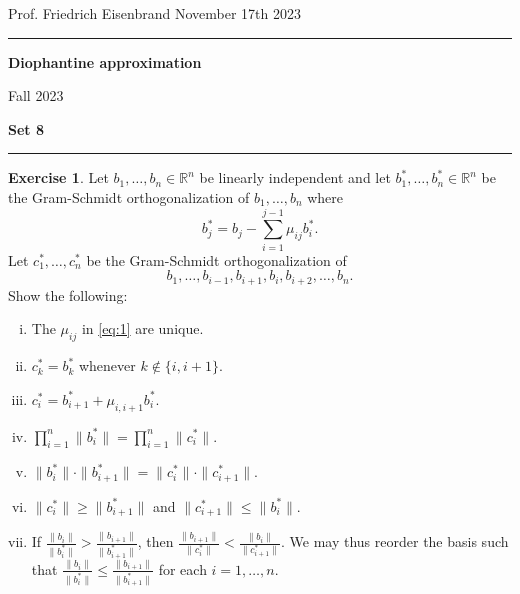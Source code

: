 \documentclass[12pt,a4paper]{article}
\date{}
\theoremstyle{plain}
\newtheorem*{Sol*}{Solution}
\theoremstyle{definition}
\newtheorem{Ex}{Exercise}
\newif\ifsolutions
\newcommand{\exercise}[2]{
			\begin{Ex} #1 \end{Ex}
			\ifsolutions  \begin{Sol*} #2 \end{Sol*} \bigskip \else \bigskip  \fi
		}
\begin{document}
\begin{center}
{Prof. Friedrich Eisenbrand \hfill November 17th 2023}
\end{center}
	
\hrule\vspace{\baselineskip}

\begin{center}
\textbf{Diophantine approximation}

Fall 2023

\bigskip

\textbf{Set 8}
\ifsolutions{\textbf{- Solutions}} \else{} \fi
\end{center}

\hrule\vspace{\baselineskip}




\exercise{Let $b_1,\dots,b_n ∈ℝ^n$ be linearly independent  and let $b_1^*,\dots,b_n^* ∈ ℝ^n$ be the Gram-Schmidt orthogonalization of $b_1,\dots,b_n$ where
  \begin{equation}
    \label{eq:1}
    b_j^* = b_j - ∑_{i=1}^{j-1}μ_{ij} b_i^*. 
  \end{equation}
  Let $c_1^*,\dots,c_n^*$ be the Gram-Schmidt orthogonalization of
  \begin{displaymath}
    b_1,\dots,b_{i-1},b_{i+1},b_i,b_{i+2},\dots,b_n.
  \end{displaymath}
  Show the following:
  \begin{enumerate}[i)]
  \item The $μ_{ij}$ in \eqref{eq:1} are unique.
  \item $c_k^* = b_k^*$ whenever $k ∉\{i,i+1\}$.
  \item $c_i^* = b_{i+1}^* + μ_{i,i+1} b_i^*$.
  \item $∏_{i=1}^n \|b_i^*\| = ∏_{i=1}^n \|c_i^*\|$. 
  \item $\|b_i^*\| ⋅\|b_{i+1}^*\| = \|c_i^*\| ⋅\|c_{i+1}^*\|$.
	\item $\| c_i^* \| \geq \| b_{i+1}^* \|$ and $\| c_{i+1}^* \| \leq \| b_{i}^* \|$.
	\item If $\frac{\| b_i \|}{\| b_i^* \|} > \frac{\| b_{i+1} \|}{\| b_{i+1}^* \|}$, then  $\frac{\| b_{i+1} \|}{\| c_i^* \|} < \frac{\| b_{i} \|}{\| c_{i+1}^* \|}$.
	We may thus reorder the basis such that $\frac{\| b_i \|}{\| b_i^* \|} \leq \frac{\| b_{i+1} \|}{\| b_{i+1}^* \|}$ for each $i=1, \dots, n$.
  \end{enumerate}

  }{}
\end{document}
